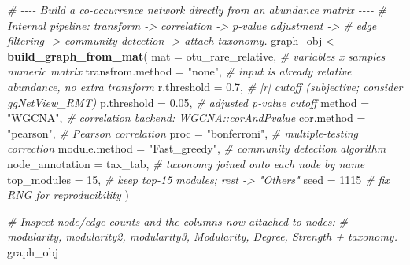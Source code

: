 \documentclass[
]{book}
\newenvironment{Shaded}{\begin{snugshade}}{\end{snugshade}}
\newcommand{\AttributeTok}[1]{\textcolor[rgb]{0.13,0.29,0.53}{#1}}
\newcommand{\CommentTok}[1]{\textcolor[rgb]{0.56,0.35,0.01}{\textit{#1}}}
\newcommand{\DecValTok}[1]{\textcolor[rgb]{0.00,0.00,0.81}{#1}}
\newcommand{\FloatTok}[1]{\textcolor[rgb]{0.00,0.00,0.81}{#1}}
\newcommand{\FunctionTok}[1]{\textcolor[rgb]{0.13,0.29,0.53}{\textbf{#1}}}
\newcommand{\NormalTok}[1]{#1}
\newcommand{\OtherTok}[1]{\textcolor[rgb]{0.56,0.35,0.01}{#1}}
\newcommand{\StringTok}[1]{\textcolor[rgb]{0.31,0.60,0.02}{#1}}
\begin{document}
\begin{Shaded}
\begin{Highlighting}[]
\CommentTok{\# {-}{-}{-}{-} Build a co{-}occurrence network directly from an abundance matrix {-}{-}{-}{-}}
\CommentTok{\# Internal pipeline: transform {-}\textgreater{} correlation {-}\textgreater{} p{-}value adjustment {-}\textgreater{}}
\CommentTok{\# edge filtering {-}\textgreater{} community detection {-}\textgreater{} attach taxonomy.}
\NormalTok{graph\_obj }\OtherTok{\textless{}{-}} \FunctionTok{build\_graph\_from\_mat}\NormalTok{(}
  \AttributeTok{mat              =}\NormalTok{ otu\_rare\_relative,  }\CommentTok{\# variables x samples numeric matrix}
  \AttributeTok{transfrom.method =} \StringTok{"none"}\NormalTok{,             }\CommentTok{\# input is already relative abundance, no extra transform}
  \AttributeTok{r.threshold      =} \FloatTok{0.7}\NormalTok{,                }\CommentTok{\# |r| cutoff (subjective; consider ggNetView\_RMT)}
  \AttributeTok{p.threshold      =} \FloatTok{0.05}\NormalTok{,               }\CommentTok{\# adjusted p{-}value cutoff}
  \AttributeTok{method           =} \StringTok{"WGCNA"}\NormalTok{,            }\CommentTok{\# correlation backend: WGCNA::corAndPvalue}
  \AttributeTok{cor.method       =} \StringTok{"pearson"}\NormalTok{,          }\CommentTok{\# Pearson correlation}
  \AttributeTok{proc             =} \StringTok{"bonferroni"}\NormalTok{,       }\CommentTok{\# multiple{-}testing correction}
  \AttributeTok{module.method    =} \StringTok{"Fast\_greedy"}\NormalTok{,      }\CommentTok{\# community detection algorithm}
  \AttributeTok{node\_annotation  =}\NormalTok{ tax\_tab,            }\CommentTok{\# taxonomy joined onto each node by name}
  \AttributeTok{top\_modules      =} \DecValTok{15}\NormalTok{,                 }\CommentTok{\# keep top{-}15 modules; rest {-}\textgreater{} "Others"}
  \AttributeTok{seed             =} \DecValTok{1115}                \CommentTok{\# fix RNG for reproducibility}
\NormalTok{)}

\CommentTok{\# Inspect node/edge counts and the columns now attached to nodes:}
\CommentTok{\# modularity, modularity2, modularity3, Modularity, Degree, Strength + taxonomy.}
\NormalTok{graph\_obj}
\end{Highlighting}
\end{Shaded}
\end{document}
